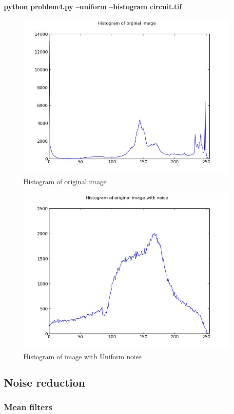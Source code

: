 \pagebreak
\textbf{python problem4.py --uniform --histogram circuit.tif}

\begin{figure}[!htb]\centering
    \includegraphics[width=0.7\linewidth]{./images/4/histogram_original.jpg}
    \caption{\small{Histogram of original image}}\label{diagram:histogram_original}
\end{figure}

\begin{figure}[!htb]\centering
    \includegraphics[width=0.7\linewidth]{./images/4/histogram_uniform.jpg}
    \caption{\small{Histogram of image with Uniform noise}}\label{diagram:histogram_uniform}
\end{figure}


\pagebreak
\subsection{Noise reduction}

\subsubsection{Mean filters}

